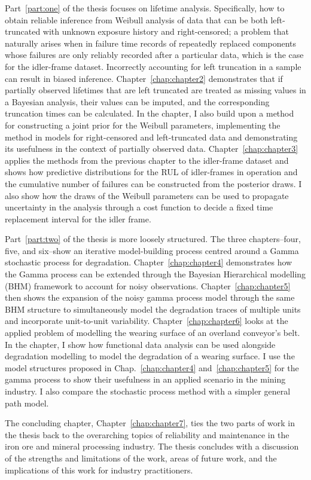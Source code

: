 Part~\ref{part:one} of the thesis focuses on lifetime analysis. Specifically, how to obtain reliable inference from Weibull analysis of data that can be both left-truncated with unknown exposure history and right-censored; a problem that naturally arises when in failure time records of repeatedly replaced components whose failures are only reliably recorded after a particular data, which is the case for the idler-frame dataset. Incorrectly accounting for left truncation in a sample can result in biased inference. Chapter~\ref{chap:chapter2} demonstrates that if partially observed lifetimes that are left truncated are treated as missing values in a Bayesian analysis, their values can be imputed, and the corresponding truncation times can be calculated. In the chapter, I also build upon a method for constructing a joint prior for the Weibull parameters, implementing the method in models for right-censored and left-truncated data and demonstrating its usefulness in the context of partially observed data. Chapter~\ref{chap:chapter3} applies the methods from the previous chapter to the idler-frame dataset and shows how predictive distributions for the RUL of idler-frames in operation and the cumulative number of failures can be constructed from the posterior draws. I also show how the draws of the Weibull parameters can be used to propagate uncertainty in the analysis through a cost function to decide a fixed time replacement interval for the idler frame.

Part~\ref{part:two} of the thesis is more loosely structured. The three chapters--four, five, and six--show an iterative model-building process centred around a Gamma stochastic process for degradation. Chapter~\ref{chap:chapter4} demonstrates how the Gamma process can be extended through the Bayesian Hierarchical modelling (BHM) framework to account for noisy observations. Chapter~\ref{chap:chapter5} then shows the expansion of the noisy gamma process model through the same BHM structure to simultaneously model the degradation traces of multiple units and incorporate unit-to-unit variability. Chapter~\ref{chap:chapter6} looks at the applied problem of modelling the wearing surface of an overland conveyor's belt. In the chapter, I show how functional data analysis can be used alongside degradation modelling to model the degradation of a wearing surface. I use the model structures proposed in Chap.~\ref{chap:chapter4} and~\ref{chap:chapter5} for the gamma process to show their usefulness in an applied scenario in the mining industry. I also compare the stochastic process method with a simpler general path model.

The concluding chapter, Chapter~\ref{chap:chapter7}, ties the two parts of work in the thesis back to the overarching topics of reliability and maintenance in the iron ore and mineral processing industry. The thesis concludes with a discussion of the strengths and limitations of the work, areas of future work, and the implications of this work for industry practitioners.